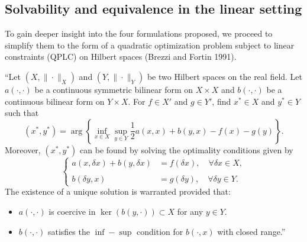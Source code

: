 \subsection{Solvability and equivalence in the linear setting} \label{sec:solvability}

To gain deeper insight into the four formulations proposed, we proceed to simplify them to the form of a quadratic optimization problem subject to linear constraints (QPLC) on Hilbert spaces (Brezzi and Fortin 1991).  

\begin{problem}[QPLC]
\label{op:QPLC}
``Let $\left(X, \|\cdot\|_X\right)$ and $\left(Y,\|\cdot\|_Y\right)$ be two Hilbert spaces on the real field. Let $a(\cdot, \cdot)$ be a continuous symmetric bilinear form on $X \times X$ and $b(\cdot, \cdot)$ be a continuous bilinear form on $Y \times X$. For $f \in X'$ and $g \in Y'$, find $x^* \in X$ and $y^* \in Y$ such that
$$
(x^*, y^*) =
\arg
\left\{
\inf_{x \in X}
\sup_{y \in Y}
\frac12 a(x, x)+b(y,x)-f(x)-g(y)
\right\}.
$$
Moreover, $(x^*,y^*)$ can be found by solving the optimality conditions given by
$$
\left\lbrace
\begin{array}{rl}
	a(x, \delta x) + b(y, \delta x) &= f(\delta x), \quad \forall \delta x \in X,\\
	\\
	b(\delta y, x) &= g(\delta y),\quad \forall \delta y \in Y.
\end{array} 	
\right. 
$$
The existence of a unique solution is warranted provided that:
\begin{itemize}
\item[i)] $a(\cdot,\cdot)$ is coercive in $\ker(b(y, \cdot))\subset X$ for any $y\in Y$.
\item[ii)] $b(\cdot,\cdot)$ satisfies the $\inf-\sup$ condition for $b(\cdot, x)$ with closed range.''
\end{itemize}
\end{problem}

